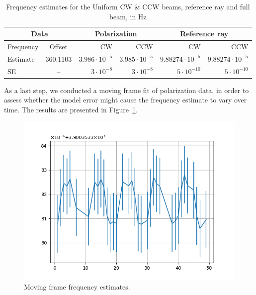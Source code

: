 \documentclass{article}
\begin{document}
\begin{table}[!h]
  \centering
  \caption{Frequency estimates for the Uniform CW \& CCW beams, reference ray and full beam, in Hz\label{tbl:FreqFit}}
  \begin{tabular}{lc|rr|rr}
    \hline
    \multicolumn{2}{c}{Data}  & \multicolumn{2}{|c|}{Polarization} & \multicolumn{2}{|c}{Reference ray} \\
    \hline
      Frequency & Offset & CW  & CCW & CW & CCW \\
    \hline
    Estimate & 360.1103 & $3.986\cdot 10^{-5}$ & $3.985\cdot 10^{-5}$ & $9.88274\cdot 10^{-5}$ & $9.88274\cdot 10^{-5}$ \\
    SE & -- & $3\cdot 10^{-8}$& $3\cdot 10^{-8}$ & $5\cdot 10^{-10}$ & $5\cdot 10^{-10}$\\
    \hline
  \end{tabular}
\end{table}

As a last step, we conducted a moving frame fit of polarization data, in order to assess whether the model error might cause the frequency estimate to vary over time. The results are presented in Figure~\ref{fig:MovingFrameEstimates}.


\begin{figure}[!h]
  \centering
  \includegraphics[width=\linewidth]{img/spin_axis_motion/moving_frame_freqs}
  \caption{Moving frame frequency estimates.\label{fig:MovingFrameEstimates}}
\end{figure}
\end{document}
